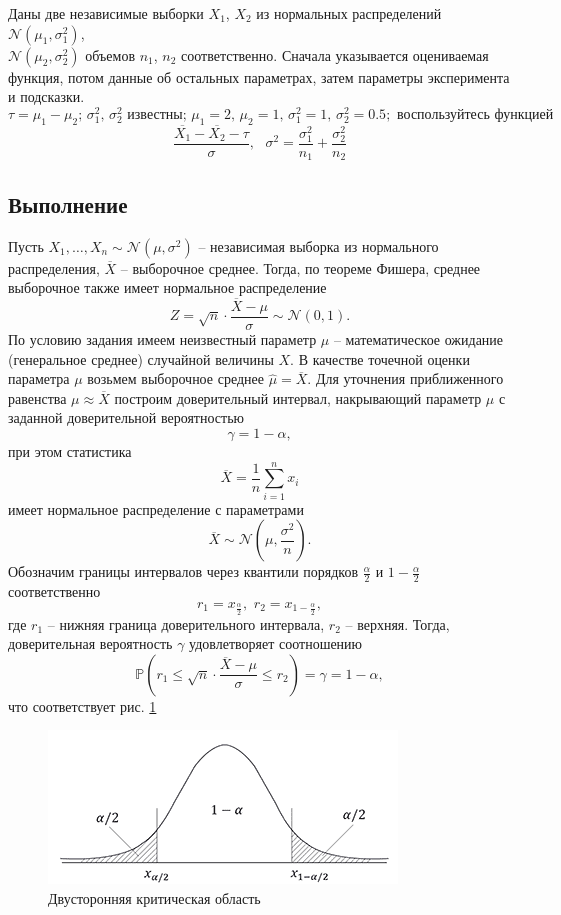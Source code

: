 \documentclass[a4paper, 12pt]{article}
\begin{document}
    Даны две независимые выборки $X_1$, $X_2$ из нормальных распределений $\mathcal{N}\left(\mu_1,\sigma_1^2\right)$,\\
    $\mathcal{N}(\mu_2,\sigma_2^2)$ объемов $n_1$, $n_2$ соответственно.
    Сначала указывается оцениваемая функция, потом данные об остальных параметрах, затем параметры эксперимента и подсказки.
    $$\tau=\mu_1-\mu_2;\,\sigma_1^2,\,\sigma_2^2\text{ известны};\,\mu_1=2,\,\mu_2=1,\,\sigma_1^2=1,\,\sigma_2^2=0.5;\text{ воспользуйтесь функцией}$$
    $$\dfrac{\overline{X_1}-\overline{X_2}-\tau}{\sigma},\,\,\,\,\sigma^2=\dfrac{\sigma_1^2}{n_1}+\dfrac{\sigma_2^2}{n_2}$$


    \subsection{Выполнение}
    Пусть $X_1,\hdots,X_n\sim\mathcal{N}\left(\mu,\sigma^2\right)$ -- независимая выборка из нормального распределения,
    $\overline{X}$ -- выборочное среднее. Тогда, по теореме Фишера, среднее выборочное также имеет нормальное распределение
    $$Z=\sqrt{n}\cdot\dfrac{\overline{X}-\mu}{\sigma}\sim\mathcal{N}\left(0,1\right).$$
    По условию задания имеем неизвестный параметр $\mu$ -- математическое ожидание (генеральное среднее) случайной величины $X$. В качестве точечной
    оценки параметра $\mu$ возьмем выборочное среднее $\hat{\mu}=\overline{X}$. Для уточнения приближенного равенства
    $\mu\approx \overline{X}$ построим доверительный интервал, накрывающий параметр $\mu$ с заданной доверительной
    вероятностью $$\gamma=1-\alpha,$$ при этом статистика $$\overline{X}=\dfrac{1}{n}\sum\limits_{i=1}^{n}x_i$$
    имеет нормальное распределение с параметрами $$\overline{X}\sim\mathcal{N}\left(\mu,\dfrac{\sigma^2}{n}\right).$$
    Обозначим границы интервалов через квантили порядков $\frac{\alpha}{2}$ и $1-\frac{\alpha}{2}$ соответственно
    $$r_1=x_{\frac{\alpha}{2}},\,\,r_2=x_{1-\frac{\alpha}{2}},$$ где $r_1$ -- нижняя граница доверительного интервала, $r_2$ -- верхняя.
    Тогда, доверительная вероятность $\gamma$ удовлетворяет соотношению
    $$\mathbb{P}\left(r_1\leq\sqrt{n}\cdot\dfrac{\overline{X}-\mu}{\sigma}\leq r_2\right)=\gamma=1-\alpha,$$
    что соответствует рис. \ref{fig:normal}
    \begin{figure}[H]
        \centering
        \includegraphics[scale=1.2]{normal.png}
        \captionsetup{skip=0pt}
        \caption{Двусторонняя критическая область}
        \label{fig:normal}
    \end{figure}
\end{document}
